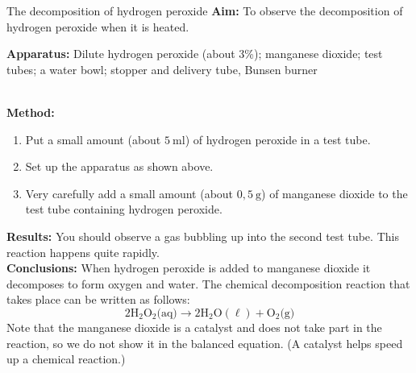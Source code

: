 \label{m38709*secfhsst!!!underscore!!!id163}
            \begin{g_experiment}{The decomposition of hydrogen peroxide}
            \nopagebreak
            \label{m38709*id63175}\noindent{}\textbf{Aim:}\newline
    To observe the decomposition of hydrogen peroxide when it is heated.\par 
        \label{m38709*id63194}\noindent{}\textbf{Apparatus:}\newline
    Dilute hydrogen peroxide (about 3\%); manganese dioxide; test tubes; a water bowl; stopper and delivery tube, Bunsen burner\par 


      \label{m38709*id63199}
    \setcounter{subfigure}{0}
	\begin{figure}[H] %
    \begin{center}
    \end{center}
 \end{figure}       
\\
        \label{m38709*id63206}\noindent{}\textbf{Method:}
\begin{enumerate}[noitemsep, label=\textbf{\arabic*}. ] 
\item Put a small amount (about $5~\text{ml}$) of hydrogen peroxide in a test tube.
\item Set up the apparatus as shown above.
\item Very carefully add a small amount (about $0,5~\text{g}$) of manganese dioxide to the test tube containing hydrogen peroxide. 
\end{enumerate}

        \label{m38709*id63254}\noindent{}\textbf{Results:}\newline
    You should observe a gas bubbling up into the second test tube. This reaction happens quite rapidly. \\ 
        \label{m38709*id63302}\noindent{}\textbf{Conclusions:}\newline
    When hydrogen peroxide is added to manganese dioxide it decomposes to form oxygen and water. The chemical decomposition reaction that takes place can be written as follows:
        \label{m38709*id63313}\nopagebreak\noindent{}
    \begin{equation*}
    2{\text{H}}_{2}{\text{O}}_{2} \text{(aq)} \to 2\text{H}_{2}\text{O}(\ell) + {\text{O}}_{2}\text{(g)}
      \end{equation*}
Note that the manganese dioxide is a catalyst and does not take part in the reaction, so we do not show it in the balanced equation. (A catalyst helps speed up a chemical reaction.) 
\end{g_experiment}
